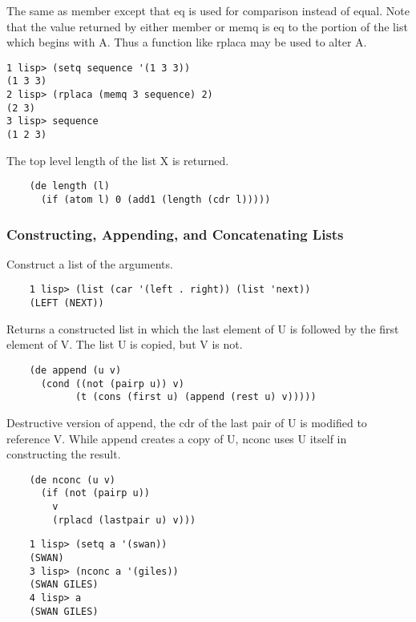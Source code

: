 {    The same as member except that eq  is  used  for  comparison
    instead of equal. Note that the value returned by either
				member or memq is eq to the  portion  of  the list which begins
				with A. Thus a function like rplaca may be used to alter A.
}
\begin{verbatim}
1 lisp> (setq sequence '(1 3 3))
(1 3 3)
2 lisp> (rplaca (memq 3 sequence) 2)
(2 3)
3 lisp> sequence
(1 2 3)
\end{verbatim}

{    The top level length of the list X is returned.
}
\begin{verbatim}
    (de length (l)
      (if (atom l) 0 (add1 (length (cdr l)))))
\end{verbatim}
\subsubsection{Constructing, Appending, and Concatenating Lists}


{    Construct a list of the arguments.
}
\begin{verbatim}
    1 lisp> (list (car '(left . right)) (list 'next))
    (LEFT (NEXT))
\end{verbatim}

{    Returns a constructed  list in which  the last element  of U
    is followed by the first element  of  V.    The  list  U  is
    copied, but V is not.
}
\begin{verbatim}
    (de append (u v)
      (cond ((not (pairp u)) v)
            (t (cons (first u) (append (rest u) v)))))
\end{verbatim}

{    Destructive version of append, the cdr of the last pair of U
    is  modified to reference V.  While append creates a copy of
    U, nconc uses U itself in constructing the result.
}
\begin{verbatim}
    (de nconc (u v)
      (if (not (pairp u))
        v
        (rplacd (lastpair u) v)))
\end{verbatim}
\begin{verbatim}
    1 lisp> (setq a '(swan))
    (SWAN)
    3 lisp> (nconc a '(giles))
    (SWAN GILES)
    4 lisp> a
    (SWAN GILES)
\end{verbatim}

